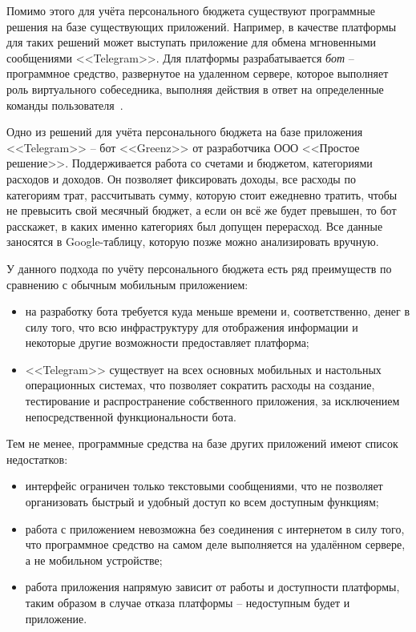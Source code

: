 Помимо этого для учёта персонального бюджета существуют программные решения на базе существующих приложений.
Например, в качестве платформы для таких решений может выступать приложение для обмена мгновенными сообщениями <<Telegram>>.
Для платформы разрабатывается \emph{бот} -- программное средство, развернутое на удаленном сервере, которое выполняет роль виртуального собеседника, выполняя действия в ответ на определенные команды пользователя~\cite{telegram_bots}.

Одно из решений для учёта персонального бюджета на базе приложения <<Telegram>> -- бот <<Greenz>> от разработчика ООО <<Простое решение>>.
Поддерживается работа со счетами и бюджетом, категориями расходов и доходов.
Он позволяет фиксировать доходы, все расходы по категориям трат, рассчитывать сумму, которую стоит ежедневно тратить, чтобы не превысить свой месячный бюджет, а если он всё же будет превышен, то бот расскажет, в каких именно категориях был допущен перерасход.
Все данные заносятся в Google-таблицу, которую позже можно анализировать вручную.

У данного подхода по учёту персонального бюджета есть ряд преимуществ по сравнению с обычным мобильным приложением:
\begin{itemize}
    \item на разработку бота требуется куда меньше времени и, соответственно, денег в силу того, что всю инфраструктуру для отображения информации и некоторые другие возможности предоставляет платформа;
    \item <<Telegram>> существует на всех основных мобильных и настольных операционных системах, что позволяет сократить расходы на создание, тестирование и распространение собственного приложения, за исключением непосредственной функциональности бота.
\end{itemize}

Тем не менее, программные средства на базе других приложений имеют список недостатков:
\begin{itemize}
    \item интерфейс ограничен только текстовыми сообщениями, что не позволяет организовать быстрый и удобный доступ ко всем доступным функциям;
    \item работа с приложением невозможна без соединения с интернетом в силу того, что программное средство на самом деле выполняется на удалённом сервере, а не мобильном устройстве;
    \item работа приложения напрямую зависит от работы и доступности платформы, таким образом в случае отказа платформы -- недоступным будет и приложение.
\end{itemize}

